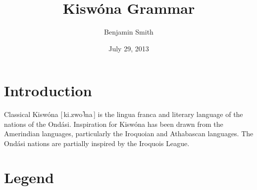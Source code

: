 \documentclass[11pt,a4paper,titlepage]{article}
\author{Benjamin Smith}
\title{Kiswóna Grammar}
\date{July 29, 2013}
\newcommand\phone[1]{[\,#1\,]}
\newcommand\hightone{˥}
\begin{document}
	

	\tableofcontents

	\newpage

	\section{Introduction}
		Classical Kiswóna \phone{ki.zwo\hightone na} is the lingua franca and literary language of the nations of the Ondási. Inspiration for Kiswóna has been drawn from the Amerindian languages, particularly the Iroquoian and Athabascan languages. The Ondási nations are partially inspired by the Iroquois League.

	\section{Legend}
\end{document}
